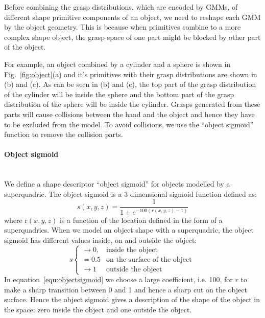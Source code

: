 Before combining the grasp distributions, which are encoded by GMMs, of different shape primitive components of an object, we need to reshape each GMM by the object geometry. This is because when primitives combine to a more complex shape object, the grasp space of one part might be blocked by other part of the object.

For example, an object combined by a cylinder and a sphere is shown in Fig.~\ref{fig:object}(a) and it's primitives with their grasp distributions are shown in (b) and (c). As can be seen in (b) and (c), the top part of the grasp distribution of the cylinder will be inside the sphere and the bottom part of the grasp distribution of the sphere will be inside the cylinder. Grasps generated from these parts will cause collisions between the hand and the object and hence they have to be excluded from the model. 
To avoid collisions, we use the ``object sigmoid'' function to remove the collision parts.

\paragraph{Object sigmoid} ~\\
\label{cha3:sec4:combine:sigmoid}
We define a shape descriptor ``object sigmoid'' for objects modelled by a superquadric. The object sigmoid is a 3 dimensional sigmoid function defined as:
\begin{equation}
s\left(x, y ,z\right) = \frac{1}{1+e^{-100\left(r\left(x, y ,z\right)-1\right)}}
\label{equ:objectsigmoid}
\end{equation}
where r$\left(x, y ,z\right)$ is a function of the location defined in the form of a superquadrics. When we model an object shape with a superquadric, the object sigmoid has different values inside, on and outside the object:
\begin{equation}
    s
    \begin{cases}
        \rightarrow0, & \text{inside the object}\  \\
        =0.5 & \text{on the surface of the object}\ \\
        \rightarrow1 & \text{outside the object}
    \end{cases}
\end{equation}
In equation~\ref{equ:objectsigmoid} we choose a large coefficient, i.e. 100, for $r$ to make a sharp transition between 0 and 1 and hence a sharp cut on the object surface. Hence the object sigmoid gives a description of the shape of the object in the space: zero inside the object and one outside the object.

